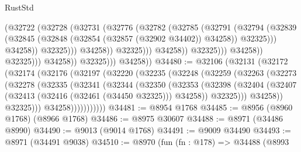 \begin{lexlean}{RustStd}
\begin{coremodule}
                                            (@32722
                                              (@32728
                                                (@32731
                                                  (@32776
                                                    (@32782
                                                      (@32785
                                                        (@32791
                                                          (@32794
                                                            (@32839
                                                              (@32845
                                                                (@32848
                                                                  (@32854
                                                                    (@32857 (@32902 @34402))
                                                                    @34258))
                                                                @32325)))
                                                          @34258))
                                                      @32325)))
                                                @34258))
                                            @32325)))
                                      @34258))
                                  @32325)))
                            @34258))
                        @32325)))
                  @34258))
              @32325)))
        @34258))
@34480 := @32106
    (@32131
      (@32172
        (@32174
          (@32176
            (@32197
              (@32220
                (@32235
                  (@32248
                    (@32259
                      (@32263
                        (@32273
                          (@32278
                            (@32335
                              (@32341
                                (@32344
                                  (@32350
                                    (@32353
                                      (@32398
                                        (@32404
                                          (@32407 (@32413 (@32416 (@32461 (@34450 @32325))) @34258))
                                          @32325)))
                                    @34258))
                                @32325)))
                          @34258)))))))))))
@34481 := @8954 @1768
@34485 := @8956 (@8960 @1768) (@8966 @1768)
@34486 := @8975 @30607
@34488 := @8971 (@34486 @8990)
@34490 := @9013 (@9014 @1768)
@34491 := @9009 @34490
@34493 := @8971 (@34491 @9038)
@34510 := @8970
    (fun (fn : @178) =>
    @34488
      (@8993

\end{coremodule}
\end{lexlean}
